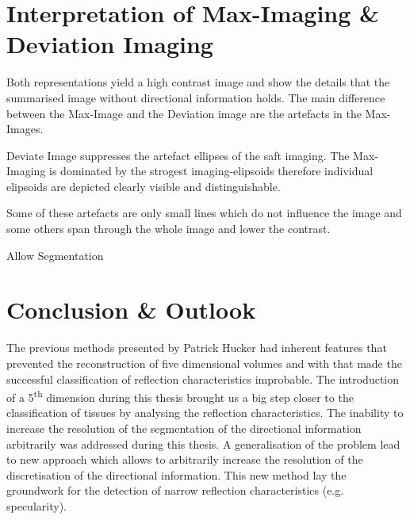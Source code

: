 




\section{Interpretation of Max-Imaging \& Deviation Imaging}

Both representations yield a high contrast image and show the details that the summarised image without directional information holds. The main difference between the Max-Image and the Deviation image are the artefacts in the Max-Images. 

Deviate Image suppresses the artefact ellipses of the \ac{saft} imaging. The Max-Imaging is dominated by the strogest imaging-elipsoids therefore individual elipsoids are depicted clearly visible and distinguishable.

Some of these artefacts are only small lines which do not influence the image and some others span through the whole image and lower the contrast. 

Allow Segmentation



\section{Conclusion \& Outlook}

The previous methods presented by Patrick Hucker \cite{PatrickHucker2014EvaluationRuckstreumodells} had inherent features that prevented the reconstruction of five dimensional volumes and with that made the successful classification of reflection characteristics improbable. The introduction of a 5\textsuperscript{th} dimension during this thesis brought us a big step closer to the classification of tissues by analysing the reflection characteristics. The inability to increase the resolution of the segmentation of the directional information arbitrarily was addressed during this thesis. A generalisation of the problem lead to new approach which allows to arbitrarily increase the resolution of the discretisation of the directional information. This new method lay the  groundwork for the detection of narrow reflection characteristics (e.g. specularity).

